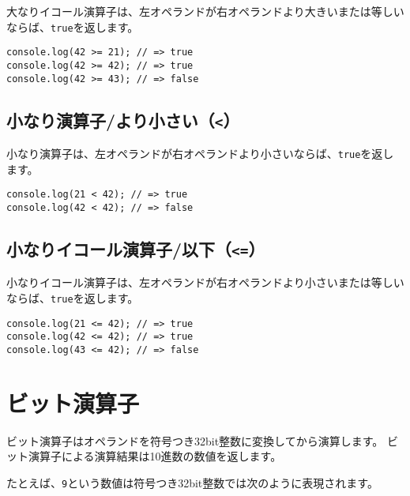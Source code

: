 大なりイコール演算子は、左オペランドが右オペランドより大きいまたは等しいならば、\texttt{true}を返します。

\begin{lstlisting}
console.log(42 >= 21); // => true
console.log(42 >= 42); // => true
console.log(42 >= 43); // => false
\end{lstlisting}

\hypertarget{less-than}{%
\subsection{\texorpdfstring{小なり演算子/より小さい（\texttt{\textless{}}）}{小なり演算子/より小さい（\textless{}）}}\label{less-than}}

小なり演算子は、左オペランドが右オペランドより小さいならば、\texttt{true}を返します。

\begin{lstlisting}
console.log(21 < 42); // => true
console.log(42 < 42); // => false
\end{lstlisting}

\hypertarget{less-than-equal}{%
\subsection{\texorpdfstring{小なりイコール演算子/以下（\texttt{\textless{}=}）}{小なりイコール演算子/以下（\textless{}=）}}\label{less-than-equal}}

小なりイコール演算子は、左オペランドが右オペランドより小さいまたは等しいならば、\texttt{true}を返します。

\begin{lstlisting}
console.log(21 <= 42); // => true
console.log(42 <= 42); // => true
console.log(43 <= 42); // => false
\end{lstlisting}

\hypertarget{bit-operator}{%
\section{ビット演算子}\label{bit-operator}}

ビット演算子はオペランドを符号つき32bit整数に変換してから演算します。
ビット演算子による演算結果は10進数の数値を返します。

たとえば、\texttt{9}という数値は符号つき32bit整数では次のように表現されます。

